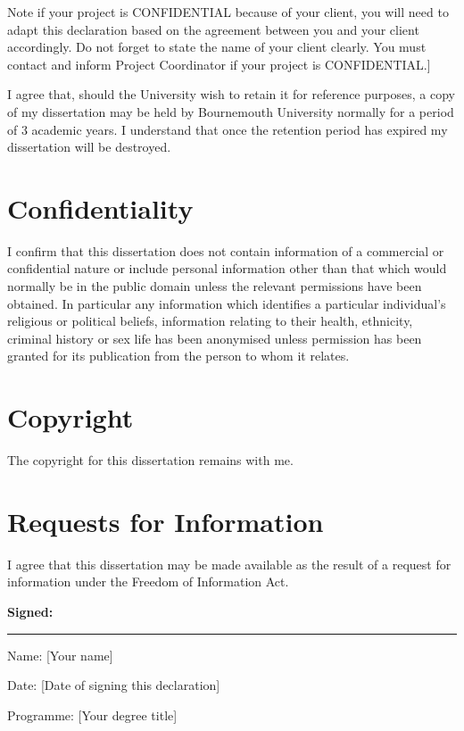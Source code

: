 Note if your project is CONFIDENTIAL because of your client, you will need to adapt this declaration based on the agreement between you and your client accordingly. Do not forget to state the name of your client clearly. You must contact and inform Project Coordinator if your project is CONFIDENTIAL.]
\color{black}

{\linespread{1.0} %
I agree that, should the University wish to retain it for reference purposes, a copy of my dissertation may be held by Bournemouth University normally for a period of 3 academic years. I understand that once the retention period has expired my dissertation will be destroyed.

\section*{Confidentiality}
I confirm that this dissertation does not contain information of a commercial or confidential nature or include personal information other than that which would normally be in the public domain unless the relevant permissions have been obtained. In particular any information which identifies a particular individual's religious or political beliefs, information relating to their health, ethnicity, criminal history or sex life has been anonymised unless permission has been granted for its publication from the person to whom it relates.

\section*{Copyright}
The copyright for this dissertation remains with me.

\section*{Requests for Information}
I agree that this dissertation may be made available as the result of a request for information under the Freedom of Information Act.


\vspace{12pt}
\textbf{Signed:}
\hrule width 0.7\textwidth
\vspace{12pt}

Name: [Your name]
\vspace{3pt}

Date: [Date of signing this declaration]
\vspace{3pt}

Programme: [Your degree title]
\vspace{3pt}

}







